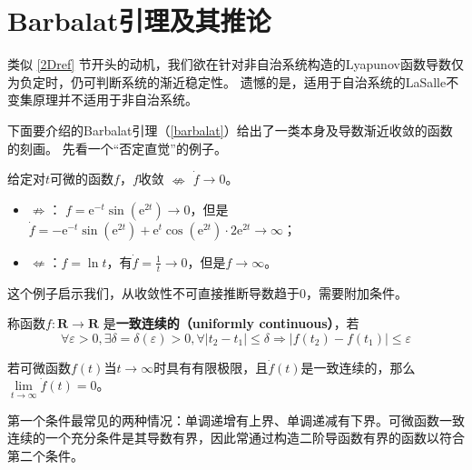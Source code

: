 \section{Barbalat引理及其推论}\label{3Eref}
类似 \ref{2Dref} 节开头的动机，我们欲在针对非自治系统构造的Lyapunov函数导数仅为负定时，仍可判断系统的渐近稳定性。
遗憾的是，适用于自治系统的LaSalle不变集原理并不适用于非自治系统。

下面要介绍的Barbalat引理（\ref{barbalat}）给出了一类本身及导数渐近收敛的函数的刻画。
先看一个“否定直觉”的例子。
\begin{example}
    给定对$t$可微的函数$f$，$f$收敛  $\nLeftrightarrow $ $\dot{f} \rightarrow 0$。
  \begin{itemize}[leftmargin=1em]
    \item $\nRightarrow $： $f = \mathrm{e}^{- t} \sin (\mathrm{e}^{2 t}) \rightarrow 0$，但是$ \dot{f} = - \mathrm{e}^{- t} \sin
    (\mathrm{e}^{2 t}) + \mathrm{e}^t \cos (\mathrm{e}^{2 t}) \cdot 2 \mathrm{e}^{2 t} \rightarrow \infty$；
    
    \item $\nLeftarrow $：$f = \ln  t$，有$ \dot{f} = \frac{1}{t} \rightarrow0$，但是$f \rightarrow \infty$。
  \end{itemize}
\end{example}
这个例子启示我们，从收敛性不可直接推断导数趋于$0$，需要附加条件。
\begin{definition}
    称函数$f : \mathbf{R} \rightarrow \mathbf{R}$ 是{\bf 一致连续的（uniformly continuous）}，若
     \[\forall \varepsilon > 0, \exists \delta
  = \delta (\varepsilon) > 0, \forall | t_2 - t_1 | \leq \delta \Rightarrow |
  f (t_2) - f (t_1) | \leq \varepsilon\]
\end{definition}
\begin{theorem}[Barbalat引理]\label{barbalat}
    若可微函数$f(t)$当$t\to\infty$时具有有限极限，且$\dot{f}(t)$是一致连续的，那么$\lim\limits_{t\to\infty}\dot{f}(t)=0$。
\end{theorem}
\begin{note}
  第一个条件最常见的两种情况：单调递增有上界、单调递减有下界。可微函数一致连续的一个充分条件是其导数有界，因此常通过构造二阶导函数有界的函数以符合第二个条件。
\end{note}
